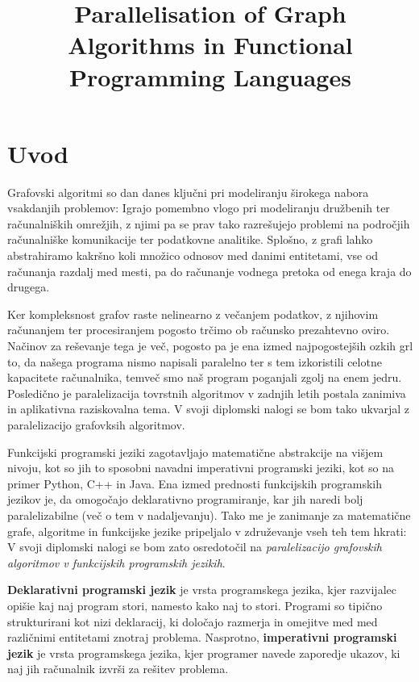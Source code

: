 \documentclass[mat1, tisk]{fmfdelo}
\title{Parallelisation of Graph Algorithms in Functional Programming Languages}
\begin{document}
\section{Uvod}

Grafovski algoritmi so dan danes ključni pri modeliranju širokega nabora vsakdanjih problemov: 
Igrajo pomembno vlogo pri modeliranju družbenih ter računalniških omrežjih, z njimi pa se prav tako razrešujejo problemi na področjih računalniške komunikacije ter podatkovne analitike. 
Splošno, z grafi lahko abstrahiramo kakršno koli množico odnosov med danimi entitetami, vse od računanja razdalj med mesti, pa do računanje vodnega pretoka od enega kraja do drugega.

Ker kompleksnost grafov raste nelinearno z večanjem podatkov, z njihovim računanjem ter procesiranjem pogosto trčimo ob računsko prezahtevno oviro.
Načinov za reševanje tega je več, pogosto pa je ena izmed najpogostejših ozkih grl to, da našega programa nismo napisali paralelno ter s tem izkoristili celotne kapacitete računalnika, 
temveč smo naš program poganjali zgolj na enem jedru. 
Posledično je paralelizacija tovrstnih algoritmov v zadnjih letih postala zanimiva in aplikativna raziskovalna tema. 
V svoji diplomski nalogi se bom tako ukvarjal z paralelizacijo grafovksih algoritmov.

Funkcijski programski jeziki zagotavljajo matematične abstrakcije na višjem nivoju, kot so jih to sposobni navadni imperativni programski jeziki, kot so na primer Python, C++ in Java. 
Ena izmed prednosti funkcijskih programskih jezikov je, da omogočajo deklarativno programiranje, kar jih naredi bolj paralelizabilne (več o tem v nadaljevanju). 
Tako me je zanimanje za matematične grafe, algoritme in funkcijske jezike pripeljalo v združevanje vseh teh tem hkrati: 
V svoji diplomski nalogi se bom zato osredotočil na \textit{paralelizacijo grafovskih algoritmov v funkcijskih programskih jezikih}.

\begin{definicija}
  \textbf{Deklarativni programski jezik} je vrsta programskega jezika, kjer razvijalec opišie kaj naj program stori, namesto kako naj to stori. Programi so tipično strukturirani kot nizi deklaracij, 
  ki določajo razmerja in omejitve med med različnimi entitetami znotraj problema. Nasprotno, \textbf{imperativni programski jezik} je vrsta programskega jezika, kjer programer navede zaporedje ukazov,
  ki naj jih računalnik izvrši za rešitev problema.
\end{definicija}
\end{document}
